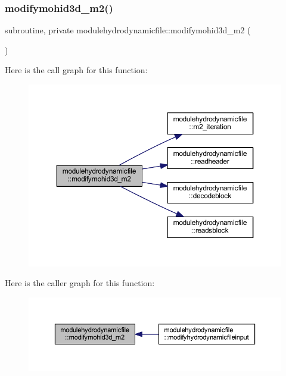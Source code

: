 \subsubsection{\texorpdfstring{modifymohid3d\+\_\+m2()}{modifymohid3d\_m2()}}
{\footnotesize\ttfamily subroutine, private modulehydrodynamicfile\+::modifymohid3d\+\_\+m2 (\begin{DoxyParamCaption}{ }\end{DoxyParamCaption})\hspace{0.3cm}{\ttfamily [private]}}

Here is the call graph for this function\+:\nopagebreak
\begin{figure}[H]
\begin{center}
\leavevmode
\includegraphics[width=350pt]{namespacemodulehydrodynamicfile_aa54587d42d6b13c11895a1f934511d94_cgraph}
\end{center}
\end{figure}
Here is the caller graph for this function\+:\nopagebreak
\begin{figure}[H]
\begin{center}
\leavevmode
\includegraphics[width=350pt]{namespacemodulehydrodynamicfile_aa54587d42d6b13c11895a1f934511d94_icgraph}
\end{center}
\end{figure}
\mbox{\label{namespacemodulehydrodynamicfile_a6d9975e28fbe49117eab154fe46cdeca}} 
